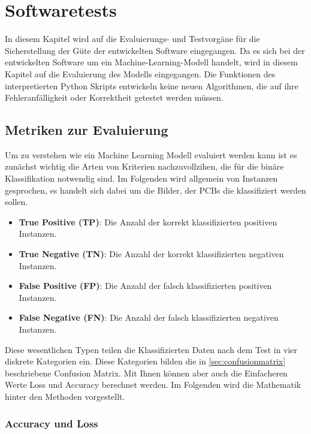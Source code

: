 \chapter{Softwaretests} \label{chap:softwaretests}

In diesem Kapitel wird auf die Evaluierungs- und Testvorgäne für die Sicherstellung der Güte der entwickelten Software eingegangen.
Da es sich bei der entwickelten Software um ein Machine-Learning-Modell handelt, wird in diesem Kapitel auf die Evaluierung des Modells eingegangen. Die Funktionen des interpretierten Python Skripts entwickeln keine neuen Algorithmen, die auf ihre Fehleranfälligkeit oder Korrektheit getestet werden müssen.

\section{Metriken zur Evaluierung} \label{sec:metriken}

Um zu verstehen wie ein Machine Learning Modell evaluiert werden kann ist es zunächst wichtig die Arten von Kriterien nachzuvollzihen, die für die binäre Klassifikation notwendig sind. Im Folgenden wird allgemein von Instanzen gesprochen, es handelt sich dabei um die Bilder, der PCBs die klassifiziert werden sollen.

\begin{itemize}
    \item \textbf{True Positive (TP)}: Die Anzahl der korrekt klassifizierten positiven Instanzen.
    \item \textbf{True Negative (TN)}: Die Anzahl der korrekt klassifizierten negativen Instanzen.
    \item \textbf{False Positive (FP)}: Die Anzahl der falsch klassifizierten positiven Instanzen.
    \item \textbf{False Negative (FN)}: Die Anzahl der falsch klassifizierten negativen Instanzen.
\end{itemize}

Diese wesentlichen Typen teilen die Klassifizierten Daten nach dem Test in vier diskrete Kategorien ein. Diese Kategorien bilden die 
in \autoref{sec:confusionmatrix} beschriebene Confusion Matrix. Mit Ihnen können aber auch die Einfacheren Werte Loss und Accuracy berechnet werden. Im Folgenden wird die Mathematik hinter den Methoden vorgestellt.

\subsection{Accuracy und Loss} \label{sec:accuracy}

